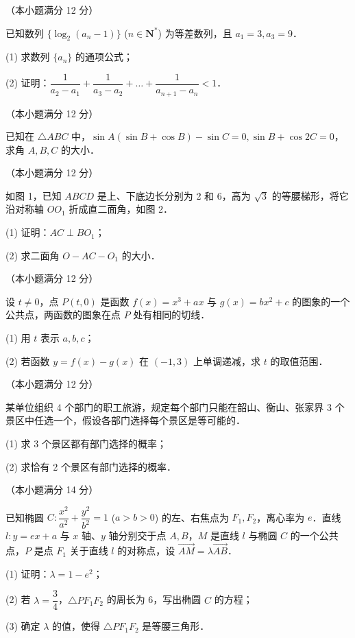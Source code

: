 \begin{question}
（本小题满分 12 分）

已知数列 $\{\log_2(a_n - 1)\}$ ($n \in \mathbf{N}^*$) 为等差数列，且 $a_1 = 3, a_3 = 9$．

(1) 求数列 $\{a_n\}$ 的通项公式；

(2) 证明：$\dfrac{1}{a_2 - a_1} + \dfrac{1}{a_3 - a_2} + \dots + \dfrac{1}{a_{n+1} - a_n} < 1$．

\end{question}
\begin{question}
（本小题满分 12 分）

已知在 $\triangle ABC$ 中，$\sin A(\sin B + \cos B) - \sin C = 0, \sin B + \cos 2C = 0$，求角 $A, B, C$ 的大小．

\Needspace{0.4\textheight}
\end{question}
\begin{question}
（本小题满分 12 分）

如图 1，已知 $ABCD$ 是上、下底边长分别为 2 和 6，高为 $\sqrt{3}$ 的等腰梯形，将它沿对称轴 $OO_1$ 折成直二面角，如图 2．
\nopagebreak[4]
\begin{center}\end{center}
\nopagebreak[4]
(1) 证明：$AC \perp BO_1$；

(2) 求二面角 $O - AC - O_1$ 的大小．

\end{question}
\begin{question}
（本小题满分 12 分）

设 $t \neq 0$，点 $P(t, 0)$ 是函数 $f(x) = x^3 + ax$ 与 $g(x) = bx^2 + c$ 的图象的一个公共点，两函数的图象在点 $P$ 处有相同的切线．

(1) 用 $t$ 表示 $a, b, c$；

(2) 若函数 $y = f(x) - g(x)$ 在 $(-1, 3)$ 上单调递减，求 $t$ 的取值范围．

\end{question}
\begin{question}
（本小题满分 12 分）

某单位组织 4 个部门的职工旅游，规定每个部门只能在韶山、衡山、张家界 3 个景区中任选一个，假设各部门选择每个景区是等可能的．

(1) 求 3 个景区都有部门选择的概率；

(2) 求恰有 2 个景区有部门选择的概率．

\end{question}
\begin{question}
（本小题满分 14 分）

已知椭圆 $C: \dfrac{x^2}{a^2} + \dfrac{y^2}{b^2} = 1$ ($a > b > 0$) 的左、右焦点为 $F_1, F_2$，离心率为 $e$．直线 $l: y = ex + a$ 与 $x$ 轴、$y$ 轴分别交于点 $A, B$，$M$ 是直线 $l$ 与椭圆 $C$ 的一个公共点，$P$ 是点 $F_1$ 关于直线 $l$ 的对称点，设 $\vec{AM} = \lambda\vec{AB}$．

(1) 证明：$\lambda = 1 - e^2$；

(2) 若 $\lambda = \dfrac{3}{4}$，$\triangle PF_1F_2$ 的周长为 6，写出椭圆 $C$ 的方程；

(3) 确定 $\lambda$ 的值，使得 $\triangle PF_1F_2$ 是等腰三角形．

\end{question}